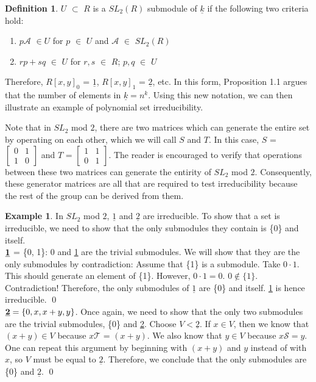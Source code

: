\documentclass[a4paper,draft]{amsproc}
\theoremstyle{plain}
\theoremstyle{definition}
\newtheorem{exm}{Example}[section]
\newtheorem{dfn}{Definition}[section]
\theoremstyle{remark}
\numberwithin{equation}{section}
\begin{document}
\begin{dfn}
$U$ $\subset$ $R$ is a  $SL_{2}(R)$ submodule of $\underline{k}$ if the following two criteria hold: 

\begin{enumerate}
  \item $p  \mathcal{A}$ $\in U$ for $p$ $\in$ $U$ and $\mathcal{A}$ $\in$ $SL_{2}(R)$ 
  \item $rp + sq$ $\in$ $U$ for $r, s$ $\in$ $R$; $p, q$ $\in$ $U$
\end{enumerate}

\end{dfn}
Therefore, $R[x,y]_{0}$ = $\underline{1}$, $R[x,y]_{1}$ = $\underline{2}$, etc. In this form, Proposition 1.1 argues that the number of elements in $\underline{k} =  n^{k}$.  Using this new notation, we can then illustrate an example of polynomial set irreducibility. 

Note that in $SL_{2}$ mod $2$, there are two matrices which can generate the entire set by operating on each other, which we will call $S$ and $T$. In this case, $S$ = 
$\begin{bmatrix}
 0&1 \\ 
 1&0 
\end{bmatrix}$ and $T$ = $\begin{bmatrix}
 1&1 \\ 
 0&1 
\end{bmatrix}$. The reader is encouraged to verify that operations between these two matrices can generate the entirity of $SL_{2}$ mod $2$. Consequently, these generator matrices are all that are required to test irreducibility because the rest of the group can be derived from them. 

\begin{exm}
In  $SL_{2}$ mod $2$, $\underline{1}$ and $\underline{2}$ are irreducible.
To show that a set is irreducible, we need to show that the only submodules they contain is \{0\} and itself. \\

$\textbf{\underline{1}}$ = \{0, 1\}: 0 and \underline{1} are the trivial submodules. We will show that they are the only submodules by contradiction: Assume that \{1\} is a submodule. Take $0 \cdot 1$. This should generate an element of \{1\}. However, $ 0 \cdot 1 = 0$. $0 \not\in \{1\}$. Contradiction! Therefore, the only submodules of $\underline{1}$ are \{0\} and itself. \underline{1} is hence irreducible. \qed \\

$\textbf{\underline{2}} = \{0, x, x + y, y\}$. Once again, we need to show that the only two submodules are the trivial submodules, \{0\} and \underline{2}. Choose $V < \underline{2}$. If $x \in V$, then we know that $(x + y) \in V$ because $x\mathcal{T}$ = $(x + y)$. We also know that $y \in V$ because $x\mathcal{S} = y$. One can repeat this argument by beginning with $(x + y)$ and $y$ instead of with $x$, so $V$ must be equal to $\underline{2}$. Therefore, we conclude that the only submodules are \{0\} and $\underline{2}$. \qed

\end{exm}
\end{document}
